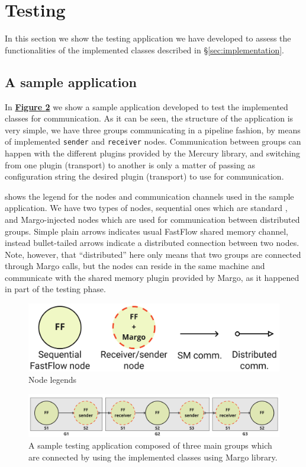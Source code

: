\section{Testing}
\label{sec:testing}
In this section we show the testing application we have developed to assess the functionalities of the implemented classes described in \S\ref{sec:implementation}.

\subsection{A sample application}
In \hyperref[fig:sample-app]{\textbf{Figure \ref{fig:sample-app}}} we show a sample application developed to test the implemented classes for communication. As it can be seen, the structure of the application is very simple, we have three groups communicating in a pipeline fashion, by means of implemented \texttt{sender} and \texttt{receiver} nodes. Communication between groups can happen with the different plugins provided by the Mercury library, and switching from one plugin (transport) to another is only a matter of passing as configuration string the desired plugin (transport) to use for communication.\newline

 shows the legend for the nodes and communication channels used in the sample application. We have two types of nodes, sequential ones which are standard , and Margo-injected nodes which are used for communication between distributed groups. Simple plain arrows indicates usual FastFlow shared memory channel, instead bullet-tailed arrows indicate a distributed connection between two nodes. Note, however, that ``distributed'' here only means that two groups are connected through Margo calls, but the nodes can reside in the same machine and communicate with the shared memory plugin provided by Margo, as it happened in part of the testing phase.

\begin{figure}[H]
    \centering
    \includegraphics[width=0.6\linewidth]{res/node-legends.jpg}
    \caption{Node legends}
    \label{fig:node-legends}
\end{figure}
\begin{figure}[H]
    \centering
    \includegraphics[width=\linewidth]{res/sample-app.jpg}
    \caption{A sample testing application composed of three main groups which are connected by using the implemented classes using Margo library.}
    \label{fig:sample-app}
\end{figure}


